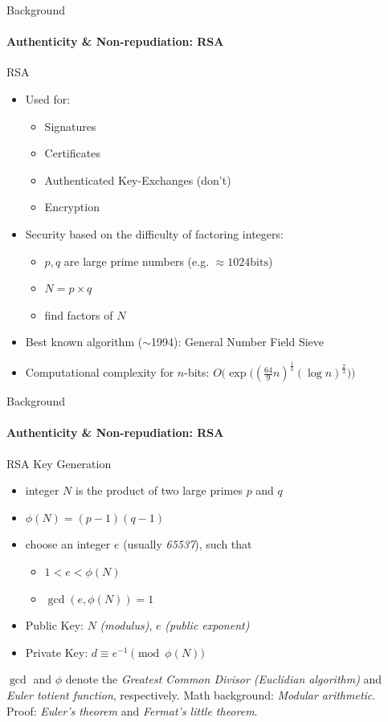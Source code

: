 \documentclass[hyperref={draft}]{beamer}
\begin{document}
\begin{frame}{Background}
  \framesubtitle{Authenticity \& Non-repudiation: RSA}
  RSA
  \begin{itemize}
    \item Used for:
    \begin{itemize}
      \item Signatures
      \item Certificates
      \item Authenticated Key-Exchanges (don't)
      \item Encryption
    \end{itemize}
    \item Security based on the difficulty of factoring integers:
    \begin{itemize}
      \item $p, q$ are large prime numbers (e.g. $\approx 1024 \text{bits}$)
      \item $N = p \times q$
      \item find factors of $N$
    \end{itemize}
    \item Best known algorithm ($\sim$1994): General Number Field Sieve
    \item Computational complexity for $n$-bits: $O\Big(\exp\big(( \frac{64}{9}n )^\frac{1}{3} ( \log{n} )^\frac{2}{3}\big)\Big)$
  \end{itemize}
\end{frame}

\begin{frame}{Background}
  \framesubtitle{Authenticity \& Non-repudiation: RSA}
  RSA Key Generation
  \begin{itemize}
    \item integer $N$ is the product of two large primes $p$ and $q$
    \item $\phi(N) = (p-1)(q-1)$ 
    \item choose an integer $e$ (usually \emph{65537}), such that
    \begin{itemize}
      \item $1 < e < \phi(N)$
      \item $\gcd(e, \phi(N)) = 1$
    \end{itemize}
    \item Public Key: $N$ \emph{(modulus)}, $e$ \emph{(public exponent)}
    \item Private Key: $d \equiv e^{-1} \pmod{\phi(N)}$
  \end{itemize}
  \vspace{30px}
  \tiny$\gcd$ and $\phi$ denote the \emph{Greatest Common Divisor (Euclidian algorithm)} and \emph{Euler totient function}, respectively.
  \newline
  \newline
  Math background: \emph{Modular arithmetic}.\\
  Proof: \emph{Euler's theorem} and \emph{Fermat's little theorem}.
\end{frame}
\end{document}
